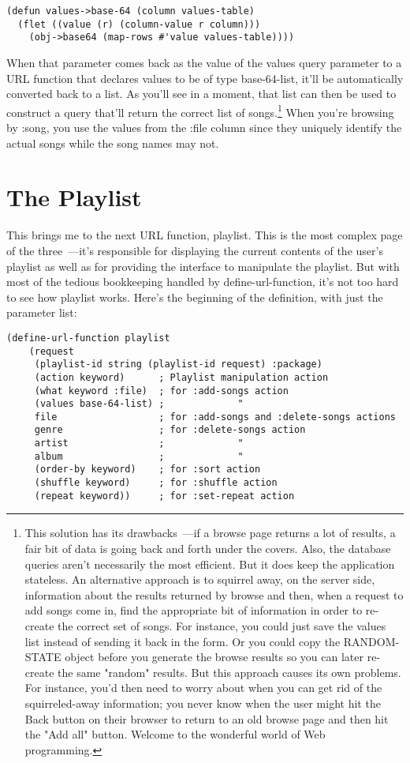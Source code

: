 \begin{lstlisting}
(defun values->base-64 (column values-table)
  (flet ((value (r) (column-value r column)))
    (obj->base64 (map-rows #'value values-table))))
\end{lstlisting}

When that parameter comes back as the value of the values query parameter to a URL
function that declares values to be of type base-64-list, it'll be automatically converted
back to a list. As you'll see in a moment, that list can then be used to construct a query
that'll return the correct list of songs.\footnote{This solution has its drawbacks~---if a
  browse page returns a lot of results, a fair bit of data is going back and forth under
  the covers. Also, the database queries aren't necessarily the most efficient. But it
  does keep the application stateless. An alternative approach is to squirrel away, on the
  server side, information about the results returned by browse and then, when a request
  to add songs come in, find the appropriate bit of information in order to re-create the
  correct set of songs. For instance, you could just save the values list instead of
  sending it back in the form. Or you could copy the RANDOM-STATE object before you
  generate the browse results so you can later re-create the same "random" results. But
  this approach causes its own problems. For instance, you'd then need to worry about when
  you can get rid of the squirreled-away information; you never know when the user might
  hit the Back button on their browser to return to an old browse page and then hit the
  "Add all" button. Welcome to the wonderful world of Web programming.} When you're
browsing by :song, you use the values from the :file column since they uniquely identify
the actual songs while the song names may not.

\section{The Playlist}

This brings me to the next URL function, playlist. This is the most complex page of the
three~---it's responsible for displaying the current contents of the user's playlist as
well as for providing the interface to manipulate the playlist. But with most of the
tedious bookkeeping handled by define-url-function, it's not too hard to see how playlist
works. Here's the beginning of the definition, with just the parameter list:

\begin{lstlisting}
(define-url-function playlist 
    (request
     (playlist-id string (playlist-id request) :package)
     (action keyword)      ; Playlist manipulation action
     (what keyword :file)  ; for :add-songs action
     (values base-64-list) ;             "
     file                  ; for :add-songs and :delete-songs actions
     genre                 ; for :delete-songs action
     artist                ;             "
     album                 ;             "
     (order-by keyword)    ; for :sort action
     (shuffle keyword)     ; for :shuffle action
     (repeat keyword))     ; for :set-repeat action
\end{lstlisting}

